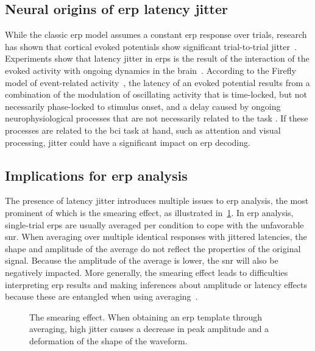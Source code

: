\subsection{Neural origins of \acs{erp} latency jitter}
While the classic \ac{erp} model assumes a constant \ac{erp} response over trials,
research has shown that cortical evoked potentials show significant
trial-to-trial jitter~\cite{Truccolo2002}.
Experiments show that latency jitter in \acp{erp} is the result of the interaction of
the evoked activity with ongoing dynamics in the brain~\cite{Hasenstaub2007,
	Kisley1999, Curto2009, Arieli1996}.
According to the Firefly model of event-related activity~\cite{Burgess2012},
the latency of an evoked potential results from a combination of the modulation
of oscillating activity that is time-locked, but not necessarily phase-locked to stimulus onset,
and a delay caused by ongoing neurophysiological processes that are not necessarily related to the task
\cite{Stokes2016,Mouraux2008}.
If these processes are related to the \ac{bci} task at hand, such as attention
and visual processing, jitter could have a significant impact on \ac{erp}
decoding.

\subsection{Implications for \acs{erp} analysis}

The presence of latency jitter introduces multiple issues to \ac{erp} analysis, the
most prominent of which is the smearing effect, as illustrated
in~\cref{fig:wcble/smearing}. In \ac{erp} analysis, single-trial \acp{erp} are usually
averaged per condition to cope with the unfavorable \ac{snr}.
When averaging over multiple identical responses with jittered latencies, the shape
and amplitude of the average do not reflect the properties
of the original signal.
Because the amplitude of the average is lower, the \ac{snr} will also be negatively impacted.
More generally, the smearing effect leads to difficulties interpreting \ac{erp}
results and making inferences about amplitude or latency effects because these
are entangled when using averaging~\cite{Luck2014}.

\begin{figure}[t]
  \centering
  
  \caption[The smearing effect.]{The smearing effect. When obtaining an \ac{erp} template through
  averaging, high jitter causes a decrease in peak amplitude and a deformation
  of the shape of the waveform.}
  \label{fig:wcble/smearing}
\end{figure}

